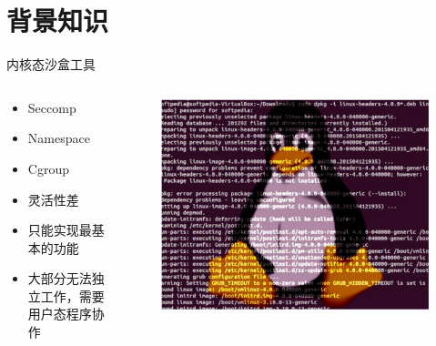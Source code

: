 \documentclass[UTF8,fontset=macnew,xcolor=table]{ctexbeamer}
\begin{document}
\section{背景知识}
\begin{frame}{内核态沙盒工具}
    \begin{columns}
        \begin{column}{0.5\textwidth}
            \begin{itemize}
                \item Seccomp
                \item Namespace
                \item Cgroup
                
                \item 灵活性差 
                \item 只能实现最基本的功能
                \item 大部分无法独立工作，需要用户态程序协作
            \end{itemize}
        \end{column}

        \begin{column}{0.5\textwidth}
            \begin{figure}[H]
                \centering
                \includegraphics[width=\columnwidth]{pic2.png}
            \end{figure}
        \end{column}
    \end{columns}
\end{frame}
\end{document}
